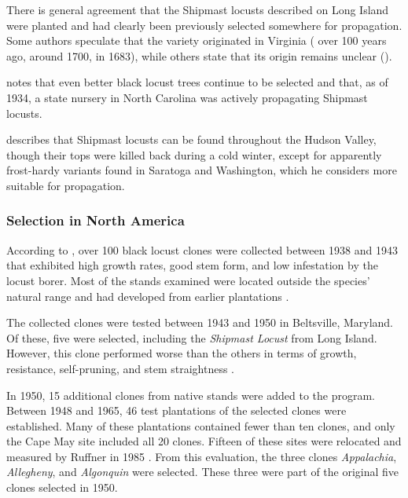 There is general agreement that the Shipmast locusts described on Long Island were planted and had clearly been previously selected somewhere for propagation. Some authors speculate that the variety originated in Virginia (\citet{hicks1883robinie} over 100 years ago, \citet{raber1936shipmast} around 1700, \citet{detwiler1937robinie} in 1683), while others state that its origin remains unclear (\citet{raber1938robinie}).

\citet{detwiler1937robinie} notes that even better black locust trees continue to be selected and that, as of 1934, a state nursery in North Carolina was actively propagating Shipmast locusts.


\citet{cope1938robinie} describes that Shipmast locusts can be found throughout the Hudson Valley, though their tops were killed back during a cold winter, except for apparently frost-hardy variants found in Saratoga and Washington, which he considers more suitable for propagation.

\subsubsection{Selection in North America}

According to \citet{santamour1970robinie,steinergroup1987robinie}, over 100 black locust clones were collected between 1938 and 1943 that exhibited high growth rates, good stem form, and low infestation by the locust borer. Most of the stands examined were located outside the species' natural range and had developed from earlier plantations \citep{hopp1941robinie}.

The collected clones were tested between 1943 and 1950 in Beltsville, Maryland. Of these, five were selected, including the \emph{Shipmast Locust} from Long Island. However, this clone performed worse than the others in terms of growth, resistance, self-pruning, and stem straightness \citep{santamour1960robinie}.

In 1950, 15 additional clones from native stands were added to the program. Between 1948 and 1965, 46 test plantations of the selected clones were established. Many of these plantations contained fewer than ten clones, and only the Cape May site included all 20 clones. Fifteen of these sites were relocated and measured by Ruffner in 1985 \citep{bongarten1992robinie}. From this evaluation, the three clones \emph{Appalachia}, \emph{Allegheny}, and \emph{Algonquin} were selected. These three were part of the original five clones selected in 1950.

